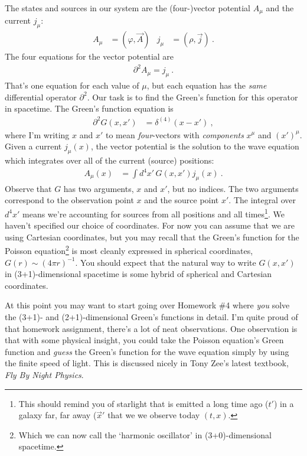 The states and sources in our system are the (four-)vector potential $A_\mu$ and the current $j_\mu$: 
\begin{align}
	A_\mu &= (\varphi, \vec{A})
	&
	j_\mu &= (\rho, \vec{j}) \ .
\end{align}
The four equations for the vector potential are
\begin{align}
	\partial^2 A_\mu = j_\mu \ .
\end{align}
That's one equation for each value of $\mu$, but each equation has the \emph{same} differential operator $\partial^2$. Our task is to find the Green's function for this operator in spacetime. The Green's function equation is
\begin{align}
	\partial^2 G(x,x') &= \delta^{(4)}(x-x') \ ,
	\label{eq:wave:eq:Greens:eq}
\end{align}
where I'm writing $x$ and $x'$ to mean \emph{four}-vectors with \emph{components} $x^\mu$ and $(x')^\mu$. Given a current $j_\mu(x)$, the vector potential is the solution to the wave equation which integrates over all of the current (source) positions:
\begin{align}
	A_\mu(x) &= \int d^4x' \, G(x,x') j_\mu(x) \ .
\end{align}
Observe that $G$ has two arguments, $x$ and $x'$, but no indices. The two arguments correspond to the observation point $x$ and the source point $x'$. The integral over $d^4x'$ means we're accounting for sources from all positions and all times\footnote{This should remind you of starlight that is emitted a long time ago ($t'$) in a galaxy far, far away ($\vec{x}'$ that we we observe today $(t,x)$.}. We haven't specified our choice of coordinates. For now you can assume that we are using Cartesian coordinates, but you may recall that the Green's function for the Poisson equation\footnote{Which we can now call the `harmonic oscillator' in (3+0)-dimensional spacetime.} is most cleanly expressed in spherical coordinates, $G(r)\sim (4\pi r)^{-1}$. You should expect that the natural way to write $G(x,x')$ in (3+1)-dimensional spacetime is some hybrid of spherical and Cartesian coordinates.

\begin{exercise}
At this point you may want to start going over Homework \#4 where \emph{you} solve the (3+1)- and (2+1)-dimensional Green's functions in detail. I'm quite proud of that homework assignment, there's a lot of neat observations. One observation is that with some physical insight, you could take the Poisson equation's Green function and \emph{guess} the Green's function for the wave equation simply by using the finite speed of light. This is discussed nicely in Tony Zee's latest textbook, \emph{Fly By Night Physics}. 
\end{exercise}


